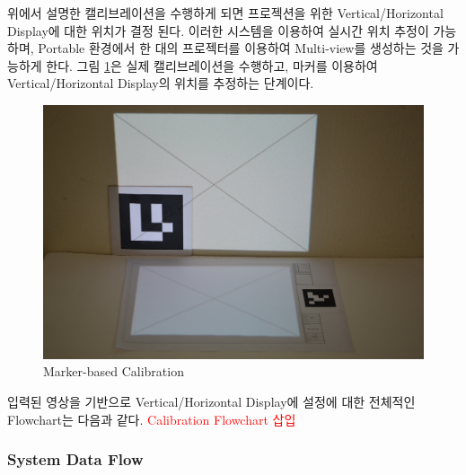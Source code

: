 위에서 설명한 캘리브레이션을 수행하게 되면 프로젝션을 위한 Vertical/Horizontal Display에 대한 위치가 결정 된다. 이러한 시스템을 이용하여 실시간 위치 추정이 가능하며, Portable 환경에서 한 대의 프로젝터를 이용하여 Multi-view를 생성하는 것을 가능하게 한다. 그림 \ref{fig:marker_calibration}은 실제 캘리브레이션을 수행하고, 마커를 이용하여 Vertical/Horizontal Display의 위치를 추정하는 단계이다. 
\begin{figure}[ht!]
	\centering
    \includegraphics[width=\textwidth]{3-System/rectified}
	\caption{Marker-based Calibration}
    \label{fig:marker_calibration}
\end{figure}
입력된 영상을 기반으로 Vertical/Horizontal Display에 설정에 대한 전체적인 Flowchart는 다음과 같다. 
\textcolor{red}{Calibration Flowchart 삽입}

\subsubsection{System Data Flow}



